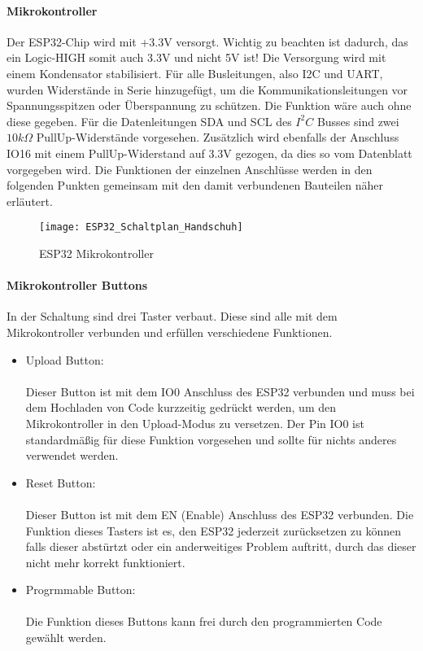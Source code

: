\documentclass[titlepage,12pt,twoside]{article}
\begin{document}
\paragraph{Mikrokontroller} 
\hfill \break
\hfill \break
Der ESP32-Chip wird mit +3.3V versorgt. Wichtig zu beachten ist dadurch, das ein Logic-HIGH somit auch 3.3V und nicht 5V ist!
Die Versorgung wird mit einem Kondensator stabilisiert. Für alle Busleitungen, also I2C und UART, wurden Widerstände in Serie
hinzugefügt, um die Kommunikationsleitungen vor Spannungsspitzen oder Überspannung zu schützen. Die Funktion wäre auch ohne diese
gegeben. Für die Datenleitungen SDA und SCL des $I^{2}C$ Busses sind zwei $10k\Omega$ PullUp-Widerstände vorgesehen. Zusätzlich 
wird ebenfalls der Anschluss IO16 mit einem PullUp-Widerstand auf 3.3V gezogen, da dies so vom Datenblatt vorgegeben wird. 
Die Funktionen der einzelnen Anschlüsse werden in den folgenden Punkten gemeinsam mit den damit verbundenen Bauteilen näher erläutert. \\
\begin{figure}[H]
	\begin{center}
		\scalebox{0.5}
		{\texttt{[image: ESP32\_Schaltplan\_Handschuh]}}
		\caption{ESP32 Mikrokontroller}
		\label{fig:ESP32_Schaltplan_Handschuh}	
	\end{center}
\end{figure}

\paragraph{Mikrokontroller Buttons}
\label{par:Mikrokontroller Buttons}
\hfill \break
\hfill \break
In der Schaltung sind drei Taster verbaut. Diese sind alle mit dem Mikrokontroller verbunden und erfüllen verschiedene Funktionen.
\begin{itemize}
	\item Upload Button: \\
		  \\ 
		  Dieser Button ist mit dem IO0 Anschluss des ESP32 verbunden und muss bei dem Hochladen von Code kurzzeitig gedrückt 
		  werden, um den Mikrokontroller in den Upload-Modus zu versetzen. Der Pin IO0 ist standardmäßig für diese Funktion vorgesehen
		  und sollte für nichts anderes verwendet werden. 
	\item Reset Button: \\
		  \\
		  Dieser Button ist mit dem EN (Enable) Anschluss des ESP32 verbunden. Die Funktion dieses Tasters ist es, den ESP32 jederzeit 
		  zurücksetzen zu können falls dieser abstürtzt oder ein anderweitiges Problem auftritt, durch das dieser nicht mehr korrekt
		  funktioniert.
	\item Progrmmable Button: \\
		  \\
		  Die Funktion dieses Buttons kann frei durch den programmierten Code gewählt werden. 
\end{itemize}
\end{document}
